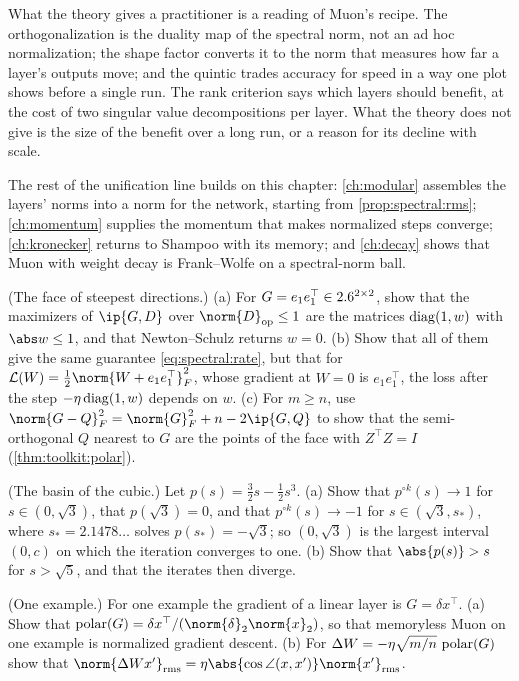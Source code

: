 \begin{refsection}
What the theory gives a practitioner is a reading of Muon's recipe. The orthogonalization is the duality map of the spectral norm, not an ad hoc normalization; the shape factor converts it to the norm that measures how far a layer's outputs move; and the quintic trades accuracy for speed in a way one plot shows before a single run. The rank criterion says which layers should benefit, at the cost of two singular value decompositions per layer. What the theory does not give is the size of the benefit over a long run, or a reason for its decline with scale.

The rest of the unification line builds on this chapter: \cref{ch:modular} assembles the layers' norms into a norm for the network, starting from \cref{prop:spectral:rms}; \cref{ch:momentum} supplies the momentum that makes normalized steps converge; \cref{ch:kronecker} returns to Shampoo with its memory; and \cref{ch:decay} shows that Muon with weight decay is Frank--Wolfe on a spectral-norm ball.

\begin{exercises}
\item \consolidation (The face of steepest directions.) (a) For $G=e_1e_1^\top\in2.6^{2\times2}$, show that the maximizers of $\ip{G,D}$ over $\norm{D}_{\op}\le1$ are the matrices $\operatorname{diag}(1,w)$ with $\abs w\le1$, and that Newton--Schulz returns $w=0$. (b) Show that all of them give the same guarantee \eqref{eq:spectral:rate}, but that for $\Loss(W)=\frac12\norm{W+e_1e_1^\top}_F^2$, whose gradient at $W=0$ is $e_1e_1^\top$, the loss after the step $-\eta\operatorname{diag}(1,w)$ depends on $w$. (c) For $m\ge n$, use $\norm{G-Q}_F^2=\norm{G}_F^2+n-2\ip{G,Q}$ to show that the semi-orthogonal $Q$ nearest to $G$ are the points of the face with $Z^\top Z=I$ (\cref{thm:toolkit:polar}).\label{ex:spectral:face}

\item \consolidation (The basin of the cubic.) Let $p(s)=\frac32s-\frac12s^3$. (a) Show that $p^{\circ k}(s)\to1$ for $s\in(0,\sqrt3)$, that $p(\sqrt3)=0$, and that $p^{\circ k}(s)\to-1$ for $s\in(\sqrt3,s_*)$, where $s_*=2.1478\ldots$ solves $p(s_*)=-\sqrt3$; so $(0,\sqrt3)$ is the largest interval $(0,c)$ on which the iteration converges to one. (b) Show that $\abs{p(s)}>s$ for $s>\sqrt5$, and that the iterates then diverge.\label{ex:spectral:basin}

\item \consolidation (One example.) For one example the gradient of a linear layer is $G=\delta x^\top$. (a) Show that $\polar(G)=\delta x^\top/(\norm{\delta}_2\norm{x}_2)$, so that memoryless Muon on one example is normalized gradient descent. (b) For $\Delta W=-\eta\sqrt{m/n}\,\operatorname{polar}(G)$ show that $\norm{\Delta Wx'}_{\rms}=\eta\abs{\cos\angle(x,x')}\norm{x'}_{\rms}$.\label{ex:spectral:rankone}


\end{exercises}
\end{refsection}
